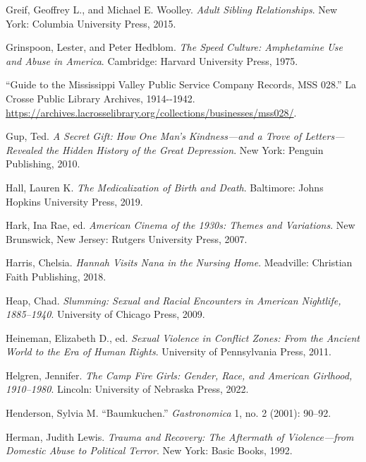 \documentclass[
  american,
  letterpaper,
]{book}
\newlength{\cslhangindent}
\newenvironment{CSLReferences}[2] %
 {\begin{list}{}{%
  \setlength{\itemindent}{0pt}
  \setlength{\leftmargin}{0pt}
  \setlength{\parsep}{0pt}
  \ifodd #1
   \setlength{\leftmargin}{\cslhangindent}
   \setlength{\itemindent}{-1\cslhangindent}
  \fi
  \setlength{\itemsep}{#2\baselineskip}}}
 {\end{list}}
\begin{document}
\begin{CSLReferences}{1}{0}
Greif, Geoffrey L., and Michael E. Woolley. \emph{Adult Sibling
Relationships}. New York: Columbia University Press, 2015.

Grinspoon, Lester, and Peter Hedblom. \emph{The Speed Culture:
Amphetamine Use and Abuse in America}. Cambridge: Harvard University
Press, 1975.

{``Guide to the Mississippi Valley Public Service Company Records, MSS
028.''} La Crosse Public Library Archives, 1914-\/-1942.
\url{https://archives.lacrosselibrary.org/collections/businesses/mss028/}.

Gup, Ted. \emph{A Secret Gift: How One Man's Kindness---and a Trove of
Letters---Revealed the Hidden History of the Great Depression}. New
York: Penguin Publishing, 2010.

Hall, Lauren K. \emph{The Medicalization of Birth and Death}. Baltimore:
Johns Hopkins University Press, 2019.

Hark, Ina Rae, ed. \emph{American Cinema of the 1930s: Themes and
Variations}. New Brunswick, New Jersey: Rutgers University Press, 2007.

Harris, Chelsia. \emph{Hannah Visits Nana in the Nursing Home}.
Meadville: Christian Faith Publishing, 2018.

Heap, Chad. \emph{Slumming: Sexual and Racial Encounters in American
Nightlife, 1885--1940}. University of Chicago Press, 2009.

Heineman, Elizabeth D., ed. \emph{Sexual Violence in Conflict Zones:
From the Ancient World to the Era of Human Rights}. University of
Pennsylvania Press, 2011.

Helgren, Jennifer. \emph{The Camp Fire Girls: Gender, Race, and American
Girlhood, 1910--1980}. Lincoln: University of Nebraska Press, 2022.

Henderson, Sylvia M. {``Baumkuchen.''} \emph{Gastronomica} 1, no. 2
(2001): 90--92.

Herman, Judith Lewis. \emph{Trauma and Recovery: The Aftermath of
Violence---from Domestic Abuse to Political Terror}. New York: Basic
Books, 1992.


\end{CSLReferences}
\end{document}
